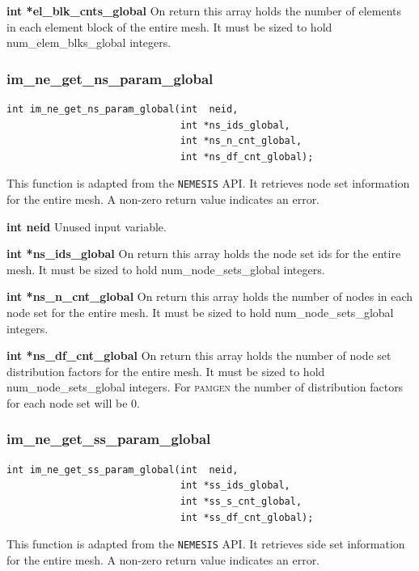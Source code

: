 {\setlength{\parindent}{0pt}
 \textbf{int *el\_blk\_cnts\_global} On return this array holds the number of elements in each element block of the entire mesh. It must be sized to hold num\_elem\_blks\_global integers.}



\subsubsection{im\_ne\_get\_ns\_param\_global}
{\ttfamily  \begin{verbatim}
int im_ne_get_ns_param_global(int  neid,
                              int *ns_ids_global,
                              int *ns_n_cnt_global,
                              int *ns_df_cnt_global);
\end{verbatim}}
This function is adapted from the \texttt{NEMESIS} API. It retrieves node set information for the entire mesh. A non-zero return value indicates an error.

{\setlength{\parindent}{0pt}
 \textbf{int neid} Unused input variable.}

{\setlength{\parindent}{0pt}
 \textbf{int *ns\_ids\_global} On return this array holds the node set ids for the entire mesh. It must be sized to hold num\_node\_sets\_global integers.}

{\setlength{\parindent}{0pt}
 \textbf{int *ns\_n\_cnt\_global} On return this array holds the number of nodes in each node set for the entire mesh. It must be sized to hold num\_node\_sets\_global integers.}

{\setlength{\parindent}{0pt}
 \textbf{int *ns\_df\_cnt\_global} On return this array holds the number of node set distribution factors for the entire mesh. It must be sized to hold num\_node\_sets\_global integers. For \textsc{pamgen} the number of distribution factors for each node set will be 0.}



\subsubsection{im\_ne\_get\_ss\_param\_global}
{\ttfamily  \begin{verbatim}
int im_ne_get_ss_param_global(int  neid,
                              int *ss_ids_global,
                              int *ss_s_cnt_global,
                              int *ss_df_cnt_global);
\end{verbatim}}
This function is adapted from the \texttt{NEMESIS} API. It retrieves side set information for the entire mesh. A non-zero return value indicates an error.

